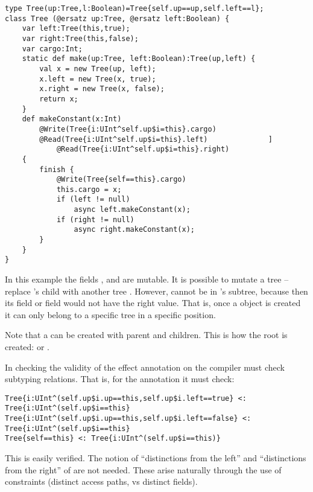 \begin{example}
  \begin{lstlisting}
type Tree(up:Tree,l:Boolean)=Tree{self.up==up,self.left==l};
class Tree (@ersatz up:Tree, @ersatz left:Boolean) {
    var left:Tree(this,true);
    var right:Tree(this,false);
    var cargo:Int;
    static def make(up:Tree, left:Boolean):Tree(up,left) {
        val x = new Tree(up, left);
        x.left = new Tree(x, true);
        x.right = new Tree(x, false);
        return x;
    }
    def makeConstant(x:Int)
        @Write(Tree{i:UInt^self.up$i=this}.cargo)
        @Read(Tree{i:UInt^self.up$i=this}.left)              ]
            @Read(Tree{i:UInt^self.up$i=this}.right)
    {
        finish {
            @Write(Tree{self==this}.cargo)
            this.cargo = x;
            if (left != null)
                async left.makeConstant(x);
            if (right != null)
                async right.makeConstant(x);
        }
    }
}
  \end{lstlisting}
In this example the fields , and 
are mutable. It is possible to mutate a tree  -- replace
's  child with another tree . However,  cannot be in
's  subtree, because then its  field or
 field would not have the right value. That is, once a
 object is created it can only belong to a specific tree in
a specific position.

Note that a  can be created with  parent and
children. This is how the root is created:
 or .

In checking the validity of the effect annotation on
 the compiler must check subtyping relations. That
is, for the  annotation it must check:
\begin{lstlisting}
Tree{i:UInt^(self.up$i.up==this,self.up$i.left==true} <: Tree{i:UInt^(self.up$i==this}
Tree{i:UInt^(self.up$i.up==this,self.up$i.left==false} <: Tree{i:UInt^(self.up$i==this}
Tree{self==this} <: Tree{i:UInt^(self.up$i==this)}
\end{lstlisting}

This is easily verified.
The notion of ``distinctions from the left'' and ``distinctions from
the right'' of \cite{DPJ} are not needed. These arise naturally
through the use of constraints (distinct access paths, vs distinct fields).
\end{example}

